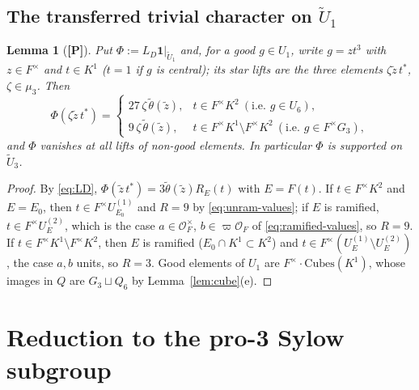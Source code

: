\documentclass[11pt]{article}
\newcommand{\tU}{\widetilde U}
\newcommand{\tth}{\widetilde\theta}
\newcommand{\Ocal}{\mathcal O}
\newcommand{\Cubes}{\mathrm{Cubes}}
\newcommand{\Ptag}{\textnormal{\textbf{[P]}}}
\theoremstyle{plain}
\newtheorem{lemma}[theorem]{Lemma}
\theoremstyle{definition}
\begin{document}
\subsection{The transferred trivial character on $\tU_1$}
\begin{lemma}[\Ptag]\label{lem:Phi}
Put $\Phi:=L_D\mathbf1|_{\tU_1}$ and, for a good $g\in U_1$, write
$g=zt^3$ with $z\in F^\times$ and $t\in K^1$ ($t=1$ if $g$ is central);
its \emph{star lifts} are the three elements $\zeta\tilde z\,t^*$,
$\zeta\in\mu_3$.  Then
\begin{equation}\label{eq:Phivalues}
 \Phi(\zeta\tilde z\,t^*)=\begin{cases}
 27\,\zeta\,\tth(\tilde z),& t\in F^\times K^2\ (\text{i.e. } g\in U_6),\\
 9\,\zeta\,\tth(\tilde z),& t\in F^\times K^1\setminus F^\times K^2\ (\text{i.e. } g\in F^\times G_3),
 \end{cases}
\end{equation}
and $\Phi$ vanishes at all lifts of non-good elements.  In particular
$\Phi$ is supported on $\tU_3$.
\end{lemma}
\begin{proof}
By \eqref{eq:LD}, $\Phi(\tilde z\,t^*)=3\tth(\tilde z)R_E(t)$ with
$E=F(t)$.  If $t\in F^\times K^2$ and $E=E_0$, then $t\in F^\times U^{(1)}_{E_0}$
and $R=9$ by \eqref{eq:unram-values}; if $E$ is ramified, $t\in F^\times U^{(2)}_E$,
which is the case $a\in\Ocal_F^\times$, $b\in\varpi\Ocal_F$ of
\eqref{eq:ramified-values}, so $R=9$.  If $t\in F^\times K^1\setminus F^\times K^2$,
then $E$ is ramified ($E_0\cap K^1\subset K^2$) and $t\in F^\times(U^{(1)}_E\setminus U^{(2)}_E)$,
the case $a,b$ units, so $R=3$.  Good elements of $U_1$ are
$F^\times\cdot\Cubes(K^1)$, whose images in $Q$ are $G_3\sqcup Q_6$ by
Lemma~\ref{lem:cube}(e).
\end{proof}

\section{Reduction to the pro-3 Sylow subgroup}\label{sec:reduction}
\end{document}
